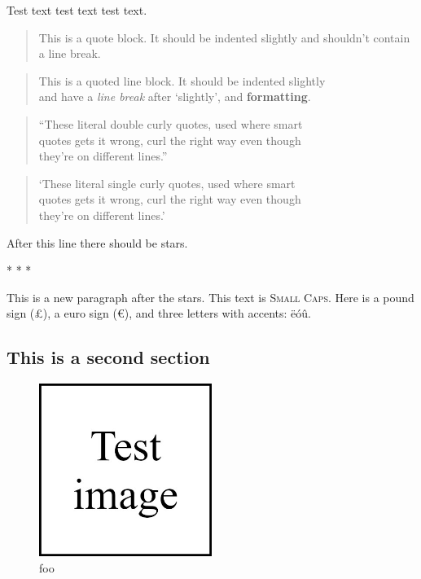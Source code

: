 \documentclass[
  12pt,
  a4paper,
]{article}
\begin{document}
\makeatletter
\@afterindentfalse
\@afterheading
\makeatother

Test text test text test text.

\begin{quote}
This is a quote block. It should be indented slightly and shouldn't
contain a line break.
\end{quote}

\begin{quote}
This is a quoted line block. It should be indented slightly\\
and have a \emph{line break} after `slightly', and \textbf{formatting}.
\end{quote}

\begin{quote}
``These literal double curly quotes, used where smart\\
quotes gets it wrong, curl the right way even though\\
they're on different lines.''
\end{quote}

\begin{quote}
`These literal single curly quotes, used where smart\\
quotes gets it wrong, curl the right way even though\\
they're on different lines.'
\end{quote}

\makeatletter
\@afterindentfalse
\@afterheading
\makeatother

After this line there should be stars.

\begin{center}* * *\end{center}

\makeatletter
\@afterindentfalse
\@afterheading
\makeatother

This is a new paragraph after the stars. This text is \textsc{Small
Caps}. Here is a pound sign (£), a euro sign (€), and three letters with
accents: ëóû.

\hypertarget{__h2_3}{%
\subsection{This is a second section}\label{__h2_3}}

\begin{figure}
\centering
\includegraphics[width=0.5\textwidth,height=\textheight]{tests/test2/image.jpg}
\caption{foo}
\end{figure}
\end{document}
